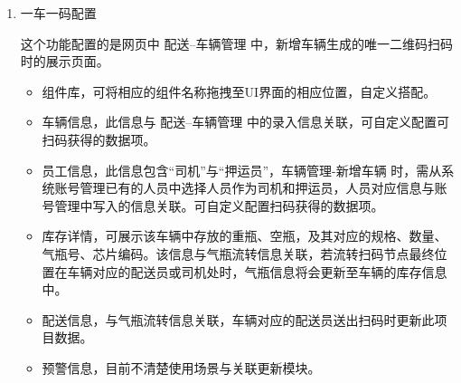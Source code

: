 \documentclass[UTF8]{ctexart}
\begin{document}
\begin{enumerate}
	
	\item 一车一码配置
	
	这个功能配置的是网页中 配送--车辆管理 中，新增车辆生成的唯一二维码扫码时的展示页面。
	\begin{itemize}
		\item 组件库，可将相应的组件名称拖拽至UI界面的相应位置，自定义搭配。
		\item 车辆信息，此信息与 配送--车辆管理 中的录入信息关联，可自定义配置可扫码获得的数据项。
		\item 员工信息，此信息包含“司机”与“押运员”，车辆管理-新增车辆 时，需从系统账号管理已有的人员中选择人员作为司机和押运员，人员对应信息与账号管理中写入的信息关联。可自定义配置扫码获得的数据项。
		\item 库存详情，可展示该车辆中存放的重瓶、空瓶，及其对应的规格、数量、气瓶号、芯片编码。该信息与气瓶流转信息关联，若流转扫码节点最终位置在车辆对应的配送员或司机处时，气瓶信息将会更新至车辆的库存信息中。
		\item 配送信息，与气瓶流转信息关联，车辆对应的配送员送出扫码时更新此项目数据。
		\item 预警信息，目前不清楚使用场景与关联更新模块。
	\end{itemize}
	
	
\end{enumerate}
\end{document}
